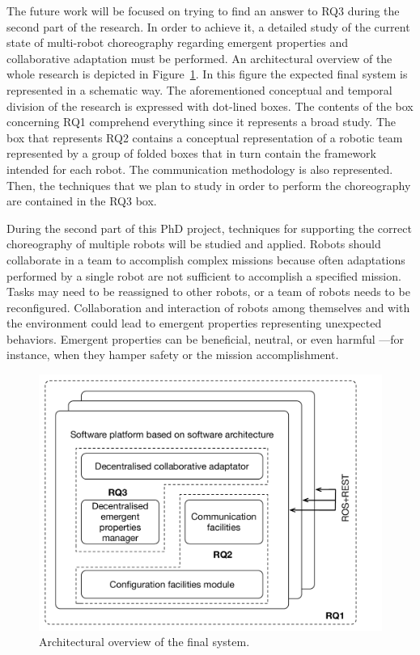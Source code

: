 The future work will be focused on trying to find an answer to RQ3 during the second part of the research.
In order to achieve it, a detailed study of the current state of multi-robot choreography regarding emergent properties and collaborative adaptation must be performed.
An architectural overview of the whole research is depicted in Figure~\ref{fig:overview}.
In this figure the expected final system is represented in a schematic way.
The aforementioned conceptual and temporal division of the research is expressed with dot-lined boxes.
The contents of the box concerning RQ1 comprehend everything since it represents a broad study.
The box that represents RQ2 contains a conceptual representation of a robotic team represented by a group of folded boxes that in turn contain the framework intended for each robot.
The communication methodology is also represented.
Then, the techniques that we plan to study in order to perform the choreography are contained in the RQ3 box.

During the second part of this PhD project, techniques for supporting the correct choreography of multiple robots will be studied and applied.
Robots should collaborate in a team to accomplish complex missions because often adaptations performed by a single robot are not sufficient to accomplish a specified mission. 
Tasks may need to be reassigned to other robots, or a team of robots needs to be reconfigured. 
Collaboration and interaction of robots among themselves and with the environment could lead to emergent properties representing unexpected behaviors. Emergent properties can be beneficial, neutral, or even harmful ---for instance, when they hamper safety or the mission accomplishment.

\begin{figure}[!t]
\begin{center}
\includegraphics[width=1\linewidth]{Figures/research.pdf}
\caption{Architectural overview of the final system.}
\label{fig:overview}
\end{center}
\end{figure}
